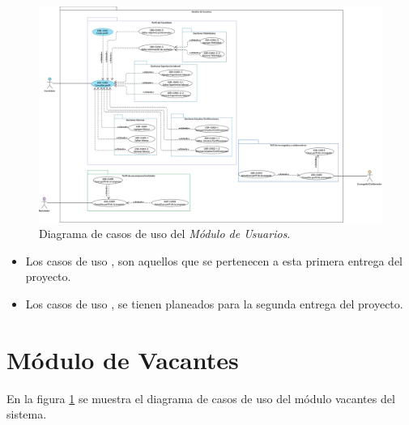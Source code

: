 	\begin{figure}[hbtp!]
		\begin{center}
			\includegraphics[width=1 \textwidth]{anexos/imagenes/CUUSR.png}
		\end{center}
		
		\caption{Diagrama de casos de uso del \textit{Módulo de Usuarios}.}
		\label{adcu:usr}
	\end{figure}

	\begin{itemize}
        \item Los casos de uso \IUazul{} , son aquellos que se pertenecen a esta primera entrega del proyecto.
        \item Los casos de uso \IUblanco{}, se tienen planeados para la segunda entrega del proyecto.
    \end{itemize} 

	
	

\section{Módulo de Vacantes}
	En la figura \ref{adcu:usr} se muestra el diagrama de casos de uso del módulo vacantes del sistema.

